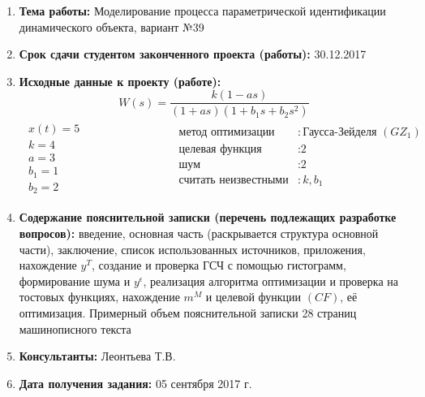 \documentclass[a4paper, 12pt]{article}
\begin{document}
\begin{enumerate}
    \item
        \textbf{Тема работы:} Моделирование процесса параметрической идентификации динамического объекта, вариант №39
    \item
        \textbf{Срок сдачи студентом законченного проекта (работы):} 30.12.2017
    \item
        \textbf{Исходные данные к проекту (работе):}
            $$W(s) = \frac{k(1-as)}{(1+as)(1+b_1s+b_2s^2)}$$
            $$
                \begin{matrix}
                    \begin{aligned}
                        x(t) = 5 \\
                        k = 4 \\
                        a = 3 \\
                        b_1 = 1 \\
                        b_2 = 2
                    \end{aligned}
                    &
                    \hspace{3cm}
                    \begin{aligned}
                        \text{метод оптимизации}&: \text{Гаусса-Зейделя $(GZ_1)$} \\
                        \text{целевая функция}&: \text{2} \\
                        \text{шум}&: \text{2} \\
                        \text{считать неизвестными}&: \text{$k, b_1$} \\
                    \end{aligned}
                \end{matrix}
            $$
    \item
        \textbf{Содержание пояснительной записки (перечень подлежащих разработке вопросов):} введение, основная часть (раскрывается структура основной части), заключение, список использованных источников, приложения, нахождение $y^T$, создание и проверка ГСЧ с помощью гистограмм, формирование шума и $y^\epsilon$, реализация алгоритма оптимизации и проверка на тостовых функциях, нахождение $m^M$ и целевой функции $(CF)$, её оптимизация. Примерный объем пояснительной записки 28 страниц машинописного текста
    \item
        \textbf{Консультанты:} Леонтьева Т.В.
    \item
        \textbf{Дата получения задания:} 05 сентября 2017 г.
\end{enumerate}
\end{document}
